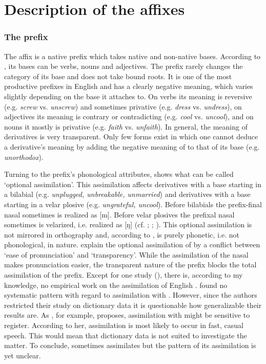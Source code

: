 \section{Description of the affixes}

\subsubsection{The prefix } {\label{description un}}

The affix  is a native prefix which takes native and non-native bases. According to \citet[ 355, 361, 371 ff]{Bauer.2013}, its bases can be verbs, nouns and adjectives. The prefix rarely changes the category of its base and does not take bound roots. It is one of the most productive prefixes in English and has a clearly negative meaning, which varies slightly depending on the base it attaches to. On verbs its meaning is reversive (e.g. \textit{screw} vs. \textit{unscrew}) and sometimes privative (e.g. \textit{dress} vs. \textit{undress}), on adjectives its meaning is contrary or contradicting (e.g. \textit{cool} vs. \textit{uncool}), and on nouns it mostly is privative (e.g. \textit{faith} vs. \textit{unfaith}).
In general, the meaning of derivatives is very transparent. Only few forms exist in which one cannot deduce a derivative's meaning by adding the negative meaning of  to that of its base (e.g. \textit{unorthodox}).

Turning to the prefix's phonological attributes,  shows what can be called `optional assimilation'. This assimilation affects derivatives with a base starting in a bilabial (e.g. \textit{unplugged, unbreakable, unmarried}) and derivatives with a base starting in a velar plosive (e.g. \textit{ungrateful, uncool}).
Before bilabials the prefix-final nasal sometimes is realized as [m]. Before velar plosives the prefixal nasal sometimes is velarized, i.e. realized as [ŋ] (cf. \citealt[5 f]{Hanote.2010}; \citealt[180]{Bauer.2013}; \citealt[125]{Okada.2013}). 
This optional assimilation is not mirrored in orthography and, according to \citet[125]{Okada.2013}, is purely phonetic, i.e. not phonological, in nature. \citet[87 f]{Stockwell.2001} explain the optional assimilation of  by a conflict between `ease of pronunciation' and `transparency'. While the assimilation of the nasal makes pronunciation easier, the transparent nature of the prefix blocks the total assimilation of the prefix.
Except for one study (\citealt{Hanote.2010}), there is, according to my knowledge, no empirical work on the assimilation of English . \cite{Hanote.2010} found no systematic pattern with regard to assimilation with . However, since the authors restricted their study on dictionary data it is questionable how generalizable their results are.  
As \citet[138]{Raffelsiefen.1999}, for example, proposes, assimilation with  might be sensitive to register.  According to her,  assimilation is most likely to occur in fast, casual speech. This would mean that dictionary data is not suited to investigate the matter.
To conclude,  sometimes assimilates but the pattern of its assimilation is yet unclear.




